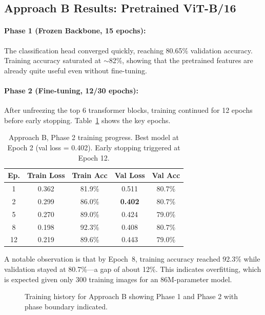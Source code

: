 \documentclass[10pt,twocolumn,letterpaper]{article}
\begin{document}
\subsection{Approach B Results: Pretrained ViT-B/16}

\paragraph{Phase 1 (Frozen Backbone, 15 epochs):}
The classification head converged quickly, reaching 80.65\% validation accuracy. Training accuracy saturated at $\sim$82\%, showing that the pretrained features are already quite useful even without fine-tuning.

\paragraph{Phase 2 (Fine-tuning, 12/30 epochs):}
After unfreezing the top 6 transformer blocks, training continued for 12 epochs before early stopping. Table~\ref{tab:phase2} shows the key epochs.

\begin{table}[h]
\centering
\caption{Approach B, Phase 2 training progress. Best model at Epoch 2 (val loss = 0.402). Early stopping triggered at Epoch 12.}
\label{tab:phase2}
\small
\begin{tabular}{ccccc}
\toprule
\textbf{Ep.} & \textbf{Train Loss} & \textbf{Train Acc} & \textbf{Val Loss} & \textbf{Val Acc} \\
\midrule
1 & 0.362 & 81.9\% & 0.511 & 80.7\% \\
2 & 0.299 & 86.0\% & \textbf{0.402} & 80.7\% \\
5 & 0.270 & 89.0\% & 0.424 & 79.0\% \\
8 & 0.198 & 92.3\% & 0.408 & 80.7\% \\
12 & 0.219 & 89.6\% & 0.443 & 79.0\% \\
\bottomrule
\end{tabular}
\end{table}

A notable observation is that by Epoch~8, training accuracy reached 92.3\% while validation stayed at 80.7\%---a gap of about 12\%. This indicates overfitting, which is expected given only 300 training images for an 86M-parameter model.

\begin{figure}[h]
\centering
{}
\caption{Training history for Approach B showing Phase 1 and Phase 2 with phase boundary indicated.}
\label{fig:approach_b_curves}
\end{figure}
\end{document}
